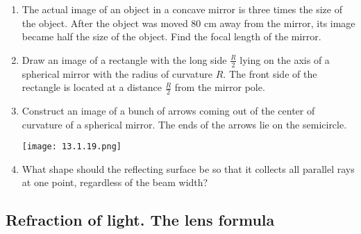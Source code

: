 \documentclass{article}
\begin{document}
\begin{enumerate}[label=13.1.\arabic*]
\item The actual image of an object in a concave mirror is three times the size of the object. After the object was moved $80$ cm away from the mirror, its image became half the size of the object. Find the focal length of the mirror.

\item Draw an image of a rectangle with the long side $\frac{R}{2}$ lying on the axis of a spherical mirror with the radius of curvature $R$. The front side of the rectangle is located at a distance $\frac{R}{2}$ from the mirror pole.

\item Construct an image of a bunch of arrows coming out of the center of curvature of a spherical mirror. The ends of the arrows lie on the semicircle.

\begin{center}
    \texttt{[image: 13.1.19.png]}
\end{center}

\item What shape should the reflecting surface be so that it collects all parallel rays at one point, regardless of the beam width?




\end{enumerate}
\subsection{Refraction of light. The lens formula}
\end{document}
